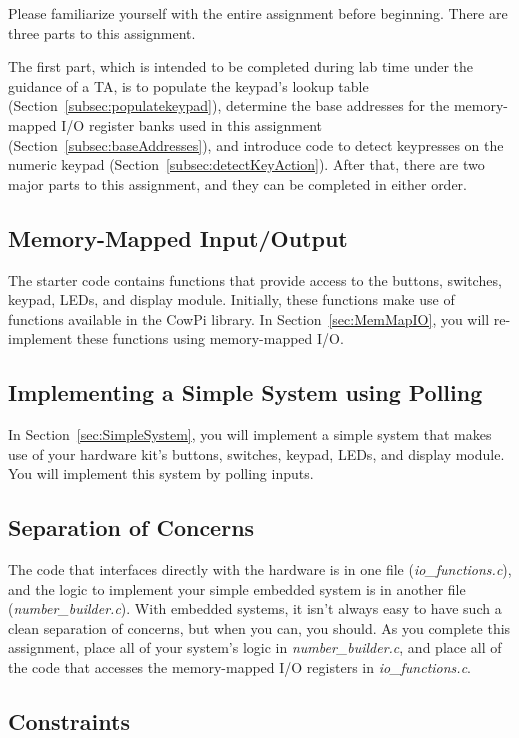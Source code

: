 Please familiarize yourself with the entire assignment before beginning.
There are three parts to this assignment.

The first part, which is intended to be completed during lab time under the guidance of a TA, is to populate the keypad's lookup table (Section~\ref{subsec:populatekeypad}), determine the base addresses for the memory-mapped I/O register banks used in this assignment (Section~\ref{subsec:baseAddresses}), and introduce code to detect keypresses on the numeric keypad (Section~\ref{subsec:detectKeyAction}).
After that, there are two major parts to this assignment, and they can be completed in either order.

\subsection{Memory-Mapped Input/Output}

The starter code contains functions that provide access to the buttons, switches, keypad, LEDs, and display module.
Initially, these functions make use of functions available in the CowPi library.
In Section~\ref{sec:MemMapIO}, you will re-implement these functions using memory-mapped I/O\@.

\subsection{Implementing a Simple System using Polling}

In Section~\ref{sec:SimpleSystem}, you will implement a simple system that makes use of your hardware kit's buttons, switches, keypad, LEDs, and display module.
You will implement this system by polling inputs.

\subsection{Separation of Concerns}

The code that interfaces directly with the hardware is in one file (\textit{io\_functions.c}), and the logic to implement your simple embedded system is in another file (\textit{number\_builder.c}).
With embedded systems, it isn't always easy to have such a clean separation of concerns, but when you can, you should.
As you complete this assignment, place all of your system's logic in \textit{number\_builder.c},
and place all of the code that accesses the memory-mapped I/O registers in \textit{io\_functions.c}.

\subsection{Constraints} \label{subsec:constraints}

